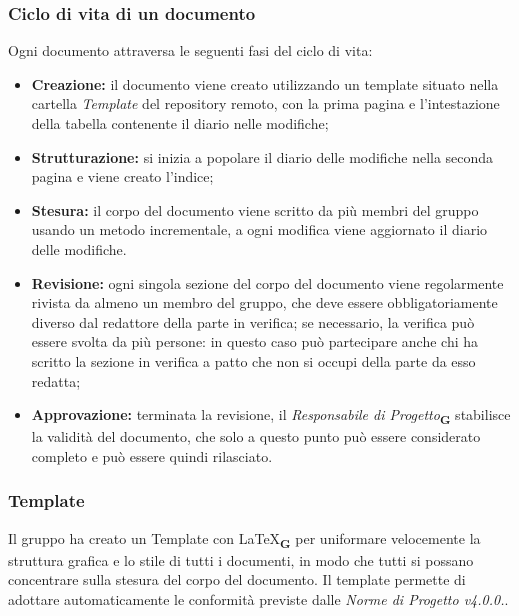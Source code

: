 \subsubsection{Ciclo di vita di un documento}
Ogni documento attraversa le seguenti fasi del ciclo di vita:
\begin{itemize}
    \item \textbf{Creazione:} il documento viene creato utilizzando un template situato nella cartella \textit{Template} del repository remoto, con la prima pagina e l'intestazione della tabella contenente il diario nelle modifiche;
    \item \textbf{Strutturazione:} si inizia a popolare il diario delle modifiche nella seconda pagina e viene creato l'indice;
    \item \textbf{Stesura:} il corpo del documento viene scritto da più membri del gruppo usando un metodo incrementale, a ogni modifica viene aggiornato il diario delle modifiche.
    \item \textbf{Revisione:} ogni singola sezione del corpo del documento viene regolarmente rivista da almeno un membro del gruppo, che deve essere obbligatoriamente diverso dal redattore della parte in verifica; se necessario, la verifica può essere svolta da più persone: in questo caso può partecipare anche chi ha scritto la sezione in verifica a patto che non si occupi della parte da esso redatta;
    \item \textbf{Approvazione:} terminata la revisione, il \textit{Responsabile di Progetto}\textsubscript{\textbf{G}} stabilisce la validità del documento, che solo a questo punto può essere considerato completo e può essere quindi rilasciato.
\end{itemize}
\subsubsection{Template}
Il gruppo ha creato un Template con \LaTeX\textsubscript{\textbf{G}} per uniformare velocemente la struttura grafica e lo stile di tutti i documenti, in modo che tutti si possano concentrare sulla stesura del corpo del documento. Il template permette di adottare automaticamente le conformità previste dalle \textit{Norme di Progetto v4.0.0.}.
